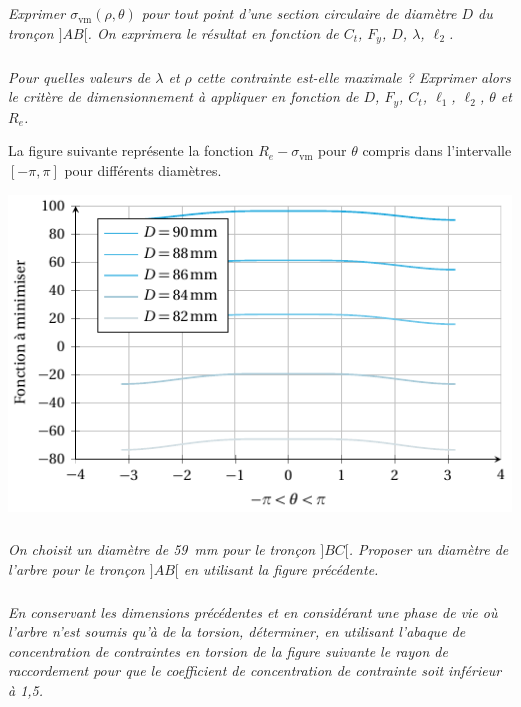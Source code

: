 \documentclass[10pt,fleqn]{article} %
\begin{document}
\begin{multicols}{2}
\subparagraph{}\textit{Exprimer $\sigma_{\text{vm}}(\rho, \theta)$ pour tout point d'une section circulaire de diamètre $D$ du tronçon $]AB[$. On exprimera le résultat en fonction de $C_t$, $F_y$, $D$, $\lambda$, $\ell_2$.}
\subparagraph{}\textit{ Pour quelles valeurs de $\lambda$ et $\rho$ cette contrainte est-elle maximale ? Exprimer alors le critère de dimensionnement à appliquer en fonction de $D$, $F_y$, 
$C_t$, $\ell_1$, $\ell_2$, $\theta$ et $R_e$.}


La figure  suivante  représente la fonction ${R_e}-\sigma_{\text{vm}}$ pour $\theta$ compris dans l'intervalle $\left[-\pi,\pi\right]$ pour différents diamètres.

\begin{center}
\includegraphics[width=\linewidth]{images/courbes}
\end{center}

\subparagraph{}\textit{On choisit un diamètre de \SI{59}{mm} pour le tronçon $]BC[$. Proposer un diamètre de l'arbre pour le tronçon $]AB[$ en utilisant la figure précédente.}



\subparagraph{}\textit{En conservant les dimensions précédentes et en considérant une phase de vie où l'arbre n'est soumis qu'à de la torsion, déterminer, en utilisant l'abaque de concentration de contraintes en torsion de la figure suivante le rayon de raccordement pour que le coefficient de concentration de contrainte soit inférieur à 1,5.}




\end{multicols}
\end{document}
